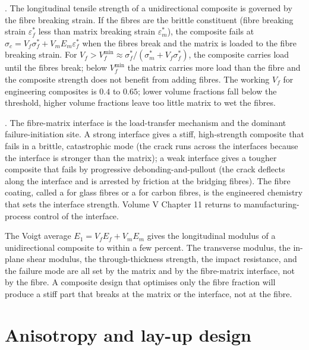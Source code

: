 . The longitudinal tensile strength
of a unidirectional composite is governed by the fibre breaking
strain. If the fibres are the brittle constituent (fibre breaking
strain $\varepsilon_f^*$ less than matrix breaking strain
$\varepsilon_m^*$), the composite fails at $\sigma_c =
V_f \sigma_f^* + V_m E_m \varepsilon_f^*$ when the fibres break and
the matrix is loaded to the fibre breaking strain. For $V_f > V_f^{\min}
\approx \sigma_f^*/(\sigma_m^* + V_f \sigma_f^*)$, the composite carries
load until the fibres break; below $V_f^{\min}$ the matrix carries
more load than the fibre and the composite strength does not benefit
from adding fibres. The working $V_f$ for engineering composites is
$0.4$ to $0.65$; lower volume fractions fall below the threshold,
higher volume fractions leave too little matrix to wet the fibres.

. The fibre-matrix interface is the
load-transfer mechanism and the dominant failure-initiation site. A
strong interface gives a stiff, high-strength composite that fails in
a brittle, catastrophic mode (the crack runs across the interfaces
because the interface is stronger than the matrix); a weak interface
gives a tougher composite that fails by progressive
debonding-and-pullout (the crack deflects along the interface and is
arrested by friction at the bridging fibres). The fibre coating,
called a  for glass fibres or a  for carbon fibres, is the engineered chemistry that sets
the interface strength. Volume V Chapter 11 returns to manufacturing-
process control of the interface.

\begin{principle}
The Voigt average $E_1 = V_f E_f + V_m E_m$ gives the longitudinal
modulus of a unidirectional composite to within a few percent. The
transverse modulus, the in-plane shear modulus, the through-thickness
strength, the impact resistance, and the failure mode are all set by
the matrix and by the fibre-matrix interface, not by the fibre. A
composite design that optimises only the fibre fraction will produce a
stiff part that breaks at the matrix or the interface, not at the
fibre.
\end{principle}

\section{Anisotropy and lay-up design}

